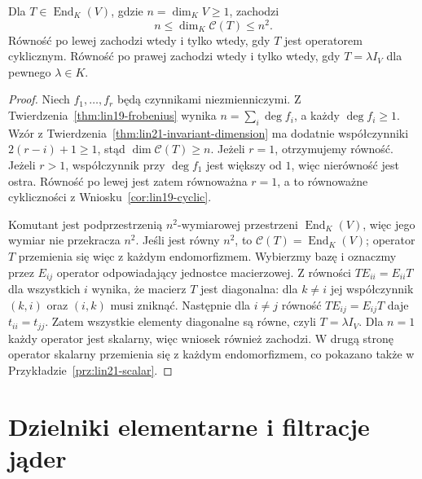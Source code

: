 \begin{wniosek}
\label{cor:lin21-bounds}
Dla \(T\in\operatorname{End}_K(V)\),
gdzie \(n=\dim_K V\ge1\), zachodzi
\[
 n\le\dim_K\mathcal C(T)\le n^2.
\]
Równość po lewej zachodzi wtedy i tylko
wtedy, gdy \(T\) jest operatorem cyklicznym.
Równość po prawej zachodzi wtedy i tylko
wtedy, gdy \(T=\lambda I_V\)
dla pewnego \(\lambda\in K\).
\end{wniosek}
\begin{proof}
Niech \(f_1,\ldots,f_r\)
będą czynnikami niezmienniczymi.
Z Twierdzenia~\ref{thm:lin19-frobenius}
wynika \(n=\sum_i\deg f_i\),
a każdy \(\deg f_i\ge1\).
Wzór z
Twierdzenia~\ref{thm:lin21-invariant-dimension}
ma dodatnie współczynniki
\(2(r-i)+1\ge1\),
stąd \(\dim\mathcal C(T)\ge n\).
Jeżeli \(r=1\), otrzymujemy
równość. Jeżeli \(r>1\),
współczynnik przy \(\deg f_1\)
jest większy od \(1\),
więc nierówność jest ostra.
Równość po lewej jest zatem
równoważna \(r=1\), a to
równoważne cykliczności z
Wniosku~\ref{cor:lin19-cyclic}.

Komutant jest podprzestrzenią
\(n^2\)-wymiarowej przestrzeni
\(\operatorname{End}_K(V)\),
więc jego wymiar nie przekracza \(n^2\).
Jeśli jest równy \(n^2\),
to \(\mathcal C(T)=\operatorname{End}_K(V)\);
operator \(T\) przemienia się więc
z każdym endomorfizmem.
Wybierzmy bazę i oznaczmy
przez \(E_{ij}\) operator
odpowiadający jednostce macierzowej.
Z równości \(TE_{ii}=E_{ii}T\)
dla wszystkich \(i\)
wynika, że macierz \(T\)
jest diagonalna: dla \(k\ne i\)
jej współczynnik \((k,i)\)
oraz \((i,k)\) musi zniknąć.
Następnie dla \(i\ne j\)
równość \(TE_{ij}=E_{ij}T\)
daje \(t_{ii}=t_{jj}\).
Zatem wszystkie elementy diagonalne
są równe, czyli \(T=\lambda I_V\).
Dla \(n=1\) każdy operator
jest skalarny, więc wniosek
również zachodzi.
W drugą stronę operator skalarny
przemienia się z każdym endomorfizmem,
co pokazano także w
Przykładzie~\ref{prz:lin21-scalar}.
\end{proof}

\section{Dzielniki elementarne i filtracje jąder}
\label{sec:lin21-elementary}

